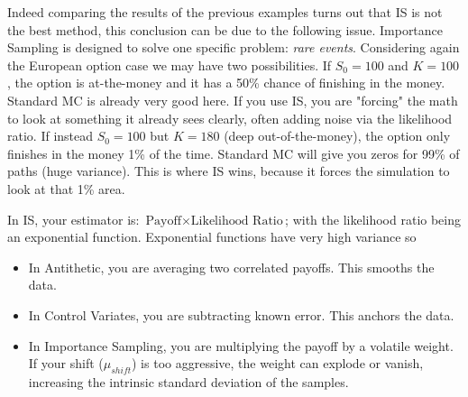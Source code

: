 Indeed comparing the results of the previous examples turns out that IS is not the best method, this conclusion can be due to the following issue.
Importance Sampling is designed to solve one specific problem: \emph{rare events}.
Considering again the European option case we may have two possibilities. If $S_0=100$ and $K=100$, the option is at-the-money and it has a 50\% chance of finishing in the money. Standard MC is already very good here. If you use IS, you are "forcing" the math to look at something it already sees clearly, often adding noise via the likelihood ratio.
If instead $S_0=100$ but $K=180$ (deep out-of-the-money), the option only finishes in the money 1\% of the time. Standard MC will give you zeros for 99\% of paths (huge variance). This is where IS wins, 
because it forces the simulation to look at that 1\% area.

In IS, your estimator is: $\text{Payoff}\times \text{Likelihood Ratio}$; with the likelihood ratio being an exponential function. Exponential functions have very high variance so
\begin{itemize}
	\item In Antithetic, you are averaging two correlated payoffs. This smooths the data.
	\item  In Control Variates, you	are subtracting known error. This anchors the data.
	\item In Importance Sampling, you are multiplying the payoff by a volatile weight. If your shift ($\mu_{shift}$) is too aggressive, the weight can explode or vanish, increasing the intrinsic standard deviation of the samples.
\end{itemize} 

